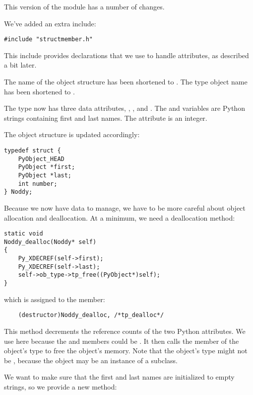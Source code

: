 

This version of the module has a number of changes.

We've added an extra include:

\begin{verbatim}
#include "structmember.h"
\end{verbatim}

This include provides declarations that we use to handle attributes,
as described a bit later.

The name of the  object structure has been shortened to
.  The type object name has been shortened to
.

The   type now has three data attributes, ,
, and .  The  and 
variables are Python strings containing first and last names. The
 attribute is an integer.

The object structure is updated accordingly:

\begin{verbatim}
typedef struct {
    PyObject_HEAD
    PyObject *first;
    PyObject *last;
    int number;
} Noddy;
\end{verbatim}

Because we now have data to manage, we have to be more careful about
object allocation and deallocation.  At a minimum, we need a
deallocation method:

\begin{verbatim}
static void
Noddy_dealloc(Noddy* self)
{
    Py_XDECREF(self->first);
    Py_XDECREF(self->last);
    self->ob_type->tp_free((PyObject*)self);
}
\end{verbatim}

which is assigned to the  member:

\begin{verbatim}
    (destructor)Noddy_dealloc, /*tp_dealloc*/
\end{verbatim}

This method decrements the reference counts of the two Python
attributes. We use  here because the
 and  members could be \NULL.  It then
calls the  member of the object's type to free the
object's memory.  Note that the object's type might not be
, because the object may be an instance of a
subclass.

We want to make sure that the first and last names are initialized to
empty strings, so we provide a new method:

